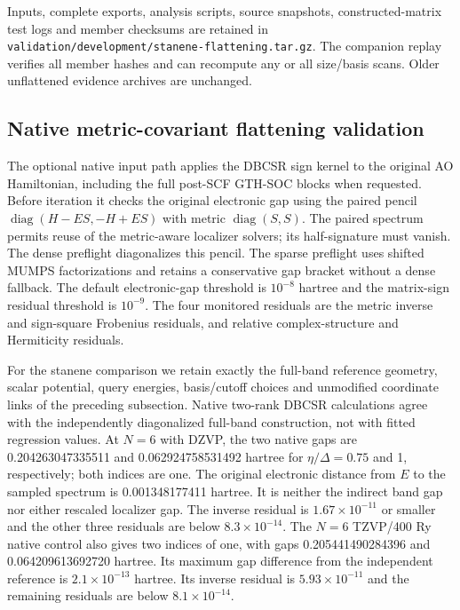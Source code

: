\documentclass[11pt]{article}
\begin{document}
Inputs, complete exports, analysis scripts, source snapshots,
constructed-matrix test logs and member checksums are retained in
\nolinkurl{validation/development/stanene-flattening.tar.gz}.
The companion replay verifies all member hashes and can recompute
any or all size/basis scans. Older unflattened evidence archives
are unchanged.

\subsection{Native metric-covariant flattening validation}
\label{sec:si-native-flattening}
The optional native input path applies the DBCSR sign kernel to
the original AO Hamiltonian, including the full post-SCF GTH-SOC
blocks when requested. Before iteration it checks the original
electronic gap using the paired pencil
$\operatorname{diag}(H-ES,-H+ES)$ with metric
$\operatorname{diag}(S,S)$. The paired spectrum permits reuse of
the metric-aware localizer solvers; its half-signature must vanish.
The dense preflight diagonalizes this pencil. The sparse preflight
uses shifted MUMPS factorizations and retains a conservative gap
bracket without a dense fallback. The default electronic-gap
threshold is $10^{-8}$ hartree and the matrix-sign residual
threshold is $10^{-9}$. The four monitored residuals are the metric
inverse and sign-square Frobenius residuals, and relative
complex-structure and Hermiticity residuals.

For the stanene comparison we retain exactly the full-band reference
geometry, scalar potential, query energies, basis/cutoff choices
and unmodified coordinate links of the preceding subsection.
Native two-rank DBCSR calculations agree with the independently
diagonalized full-band construction, not with fitted regression
values. At $N=6$ with DZVP, the two native gaps are
0.204263047335511 and 0.062924758531492 hartree for
$\eta/\Delta=0.75$ and 1, respectively; both indices are one.
The original electronic distance from $E$ to the sampled spectrum
is 0.001348177411 hartree. It is neither the indirect band gap
nor either rescaled localizer gap. The inverse residual is
$1.67\times10^{-11}$ or smaller and the other three residuals
are below $8.3\times10^{-14}$.
The $N=6$ TZVP/400 Ry native control also gives two indices of one,
with gaps 0.205441490284396 and 0.064209613692720 hartree.
Its maximum gap difference from the independent reference is
$2.1\times10^{-13}$ hartree. Its inverse residual is
$5.93\times10^{-11}$ and the remaining residuals are below
$8.1\times10^{-14}$.
\end{document}
